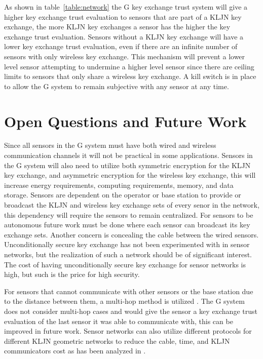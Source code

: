 \documentclass{ws-fnl2}
\begin{document}
As shown in table~\ref{table:network} the G key exchange trust system will give a higher key exchange trust evaluation to sensors that are part of a KLJN key exchange, the more KLJN key exchanges a sensor has the higher the key exchange trust evaluation. Sensors without a KLJN key exchange will have a lower key exchange trust evaluation, even if there are an infinite number of sensors with only wireless key exchange. This mechanism will prevent a lower level sensor attempting to undermine a higher level sensor since there are ceiling limits to sensors that only share a wireless key exchange. A kill switch is in place to allow the G system to remain subjective with any sensor at any time.



\section{Open Questions and Future Work}

Since all sensors in the G system must have both wired and wireless communication channels it will not be practical in some applications. Sensors in the G system will also need to utilize both symmetric encryption for the KLJN key exchange, and asymmetric encryption for the wireless key exchange, this will increase energy requirements, computing requirements, memory, and data storage. Sensors are dependent on the operator or base station to provide or broadcast the KLJN and wireless key exchange sets of every senor in the network, this dependency will require the sensors to remain centralized. For sensors to be autonomous future work must be done where each sensor can broadcast its key exchange sets. Another concern is concealing the cable between the wired sensors. Unconditionally secure key exchange has not been experimented with in sensor networks, but the realization of such a network should be of significant interest. The cost of having unconditionally secure key exchange for sensor networks is high, but such is the price for high security. 

For sensors that cannot communicate with other sensors or the base station due to the distance between them, a multi-hop method is utilized \cite{random1}. The G system does not consider multi-hop cases and would give the sensor a key exchange trust evaluation of the last sensor it was able to communicate with, this can be improved in future work. Sensor networks can also utilize different protocols for different KLJN geometric networks to reduce the cable, time, and KLJN communicators cost as has been analyzed in \cite{me1, me2}. 
\end{document}
